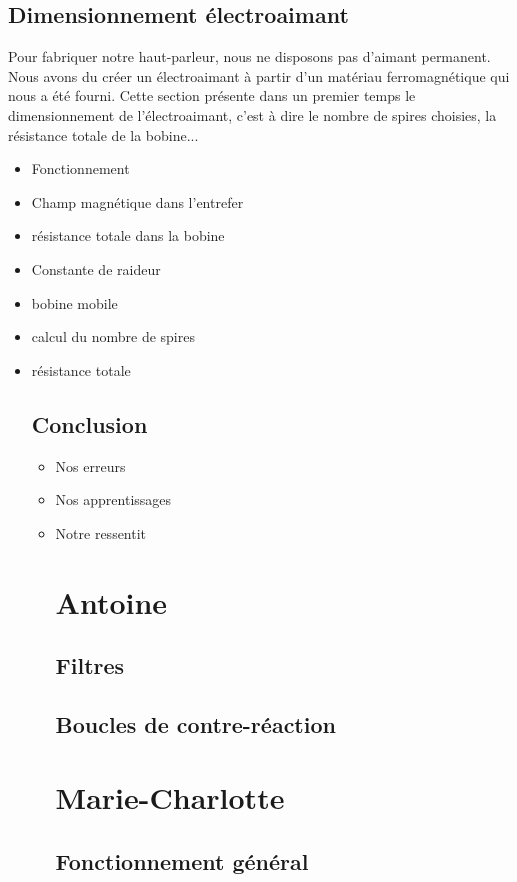 \documentclass{article}
\begin{document}
\subsection{Dimensionnement électroaimant}
Pour fabriquer notre haut-parleur, nous ne disposons pas d'aimant permanent. Nous avons du créer un électroaimant à partir d'un
matériau ferromagnétique qui nous a été fourni. Cette section présente dans un premier temps le dimensionnement de l'électroaimant, c'est à dire le nombre 
de spires choisies, la résistance totale de la bobine...
\begin{itemize}
    \item Fonctionnement
    \item Champ magnétique dans l'entrefer
    \item résistance totale dans la bobine
    \item Constante de raideur
    \item bobine mobile
    \item calcul du nombre de spires
    \item résistance totale
\subsection{Conclusion}
\begin{itemize}
    \item Nos erreurs
    \item Nos apprentissages
    \item Notre ressentit
\section{Antoine}
\subsection{Filtres}

\subsection{Boucles de contre-réaction}

\section{Marie-Charlotte}
\subsection{Fonctionnement général}


\end{itemize}
\end{itemize}
\end{document}
